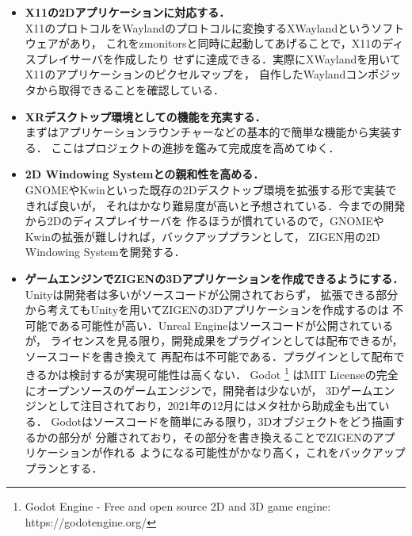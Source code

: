 \begin{itemize}
      \item \textbf{X11の2Dアプリケーションに対応する．\\}
            X11のプロトコルをWaylandのプロトコルに変換するXWaylandというソフトウェアがあり，
            これをzmonitorsと同時に起動してあげることで，X11のディスプレイサーバを作成したり
            せずに達成できる．実際にXWaylandを用いてX11のアプリケーションのピクセルマップを，
            自作したWaylandコンポジッタから取得できることを確認している．

      \item \textbf{XRデスクトップ環境としての機能を充実する．\\}
            まずはアプリケーションラウンチャーなどの基本的で簡単な機能から実装する．
            ここはプロジェクトの進捗を鑑みて完成度を高めてゆく．

      \item \textbf{2D Windowing Systemとの親和性を高める．\\}
            GNOMEやKwinといった既存の2Dデスクトップ環境を拡張する形で実装できれば良いが，
            それはかなり難易度が高いと予想されている．今までの開発から2Dのディスプレイサーバを
            作るほうが慣れているので，GNOMEやKwinの拡張が難しければ，バックアッププランとして，
            ZIGEN用の2D Windowing Systemを開発する．

      \item \textbf{ゲームエンジンでZIGENの3Dアプリケーションを作成できるようにする．\\}
            Unityは開発者は多いがソースコードが公開されておらず，
            拡張できる部分から考えてもUnityを用いてZIGENの3Dアプリケーションを作成するのは
            不可能である可能性が高い．Unreal Engineはソースコードが公開されているが，
            ライセンスを見る限り，開発成果をプラグインとしては配布できるが，ソースコードを書き換えて
            再配布は不可能である．プラグインとして配布できるかは検討するが実現可能性は高くない．
            Godot
            \footnote{Godot Engine - Free and open source 2D and 3D game engine: https://godotengine.org/}
            はMIT Licenseの完全にオープンソースのゲームエンジンで，開発者は少ないが，
            3Dゲームエンジンとして注目されており，2021年の12月にはメタ社から助成金も出ている．
            Godotはソースコードを簡単にみる限り，3Dオブジェクトをどう描画するかの部分が
            分離されており，その部分を書き換えることでZIGENのアプリケーションが作れる
            ようになる可能性がかなり高く，これをバックアッププランとする．


\end{itemize}
